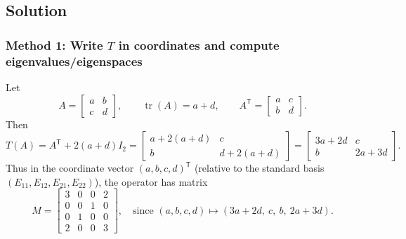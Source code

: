 \documentclass[12pt]{article}
\DeclareMathOperator{\tr}{tr}
\begin{document}
\subsection{Solution}

\subsubsection{Method 1: Write $T$ in coordinates and compute eigenvalues/eigenspaces}
Let
\[
A=\begin{bmatrix}a&b\\c&d\end{bmatrix},\qquad \tr(A)=a+d,\qquad A^{\mathsf T}=\begin{bmatrix}a&c\\b&d\end{bmatrix}.
\]
Then
\[
T(A)=A^{\mathsf T}+2(a+d)I_2=
\begin{bmatrix}
a+2(a+d) & c\\
b & d+2(a+d)
\end{bmatrix}
=
\begin{bmatrix}
3a+2d & c\\
b & 2a+3d
\end{bmatrix}.
\]
Thus in the coordinate vector $(a,b,c,d)^{\mathsf T}$ (relative to the standard basis $(E_{11},E_{12},E_{21},E_{22})$),
the operator has matrix
\[
M=
\begin{bmatrix}
3&0&0&2\\
0&0&1&0\\
0&1&0&0\\
2&0&0&3
\end{bmatrix},
\quad
\text{since }
(a,b,c,d)\mapsto (3a+2d,\ c,\ b,\ 2a+3d).
\]
\end{document}
